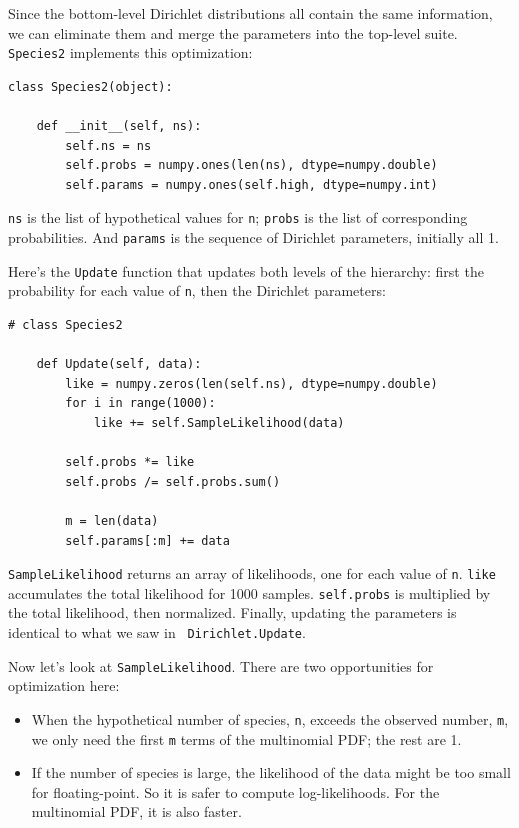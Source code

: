 \documentclass[12pt]{book}
\begin{document}
Since the bottom-level Dirichlet distributions all contain the same
information, we can eliminate them and merge the parameters into
the top-level suite.  {\tt Species2} implements this optimization:

\begin{verbatim}
class Species2(object):
    
    def __init__(self, ns):
        self.ns = ns
        self.probs = numpy.ones(len(ns), dtype=numpy.double)
        self.params = numpy.ones(self.high, dtype=numpy.int)
\end{verbatim}

{\tt ns} is the list of hypothetical values for {\tt n};
{\tt probs} is the list of corresponding probabilities.  And
{\tt params} is the sequence of Dirichlet parameters, initially
all 1.

Here's the {\tt Update} function that updates both levels of
the hierarchy: first the probability for each value of {\tt n},
then the Dirichlet parameters:

\begin{verbatim}
# class Species2

    def Update(self, data):
        like = numpy.zeros(len(self.ns), dtype=numpy.double)
        for i in range(1000):
            like += self.SampleLikelihood(data)

        self.probs *= like
        self.probs /= self.probs.sum()

        m = len(data)
        self.params[:m] += data
\end{verbatim}

{\tt SampleLikelihood} returns an array of likelihoods, one for
each value of {\tt n}.  {\tt like} accumulates the total likelihood
for 1000 samples.  {\tt self.probs}
is multiplied by the total likelihood, then normalized.
Finally, updating the parameters is identical to what we saw in {\tt
  Dirichlet.Update}.

Now let's look at {\tt SampleLikelihood}.  There are two
opportunities for optimization here:

\begin{itemize}

\item When the hypothetical number of species, {\tt n},
exceeds the observed number, {\tt m}, we only need the first {\tt m}
terms of the multinomial PDF; the rest are 1.

\item If the number of species is large, the likelihood of the data
might be too small for floating-point.  So it is safer to compute
log-likelihoods.  For the multinomial PDF, it is also faster.

\end{itemize}
\end{document}

